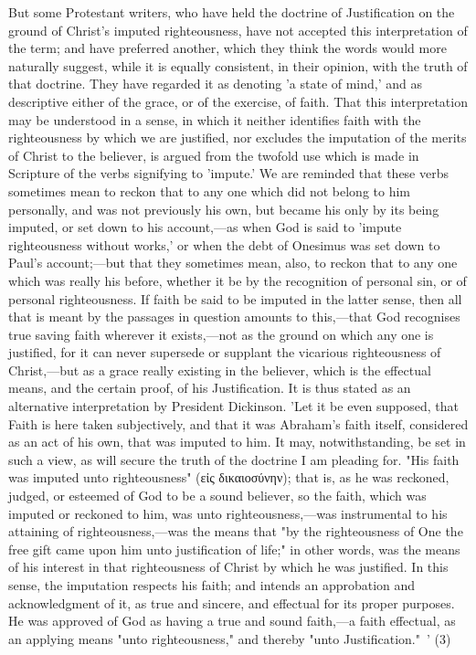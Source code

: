 \documentclass[
]{book}
\begin{document}
But some Protestant writers, who have held the doctrine of Justification on the ground of Christ's imputed righteousness, have not accepted this interpretation of the term; and have preferred another, which they think the words would more naturally suggest, while it is equally consistent, in their opinion, with the truth of that doctrine. They have regarded it as denoting 'a state of mind,' and as descriptive either of the grace, or of the exercise, of faith. That this interpretation may be understood in a sense, in which it neither identifies faith with the righteousness by which we are justified, nor excludes the imputation of the merits of Christ to the believer, is argued from the twofold use which is made in Scripture of the verbs signifying to 'impute.' We are reminded that these verbs sometimes mean to reckon that to any one which did not belong to him personally, and was not previously his own, but became his only by its being imputed, or set down to his account,---as when God is said to 'impute righteousness without works,' or when the debt of Onesimus was set down to Paul's account;---but that they sometimes mean, also, to reckon that to any one which was really his before, whether it be by the recognition of personal sin, or of personal righteousness. If faith be said to be imputed in the latter sense, then all that is meant by the passages in question amounts to this,---that God recognises true saving faith wherever it exists,---not as the ground on which any one is justified, for it can never supersede or supplant the vicarious righteousness of Christ,---but as a grace really existing in the believer, which is the effectual means, and the certain proof, of his Justification. It is thus stated as an alternative interpretation by President Dickinson. 'Let it be even supposed, that Faith is here taken subjectively, and that it was Abraham's faith itself, considered as an act of his own, that was imputed to him. It may, notwithstanding, be set in such a view, as will secure the truth of the doctrine I am pleading for. "His faith was imputed unto righteousness" (εἰς δικαιοσύνην); that is, as he was reckoned, judged, or esteemed of God to be a sound believer, so the faith, which was imputed or reckoned to him, was unto righteousness,---was instrumental to his attaining of righteousness,---was the means that "by the righteousness of One the free gift came upon him unto justification of life;" in other words, was the means of his interest in that righteousness of Christ by which he was justified. In this sense, the imputation respects his faith; and intends an approbation and acknowledgment of it, as true and sincere, and effectual for its proper purposes. He was approved of God as having a true and sound faith,---a faith effectual, as an applying means "unto righteousness," and thereby "unto Justification."~' (3)
\end{document}
